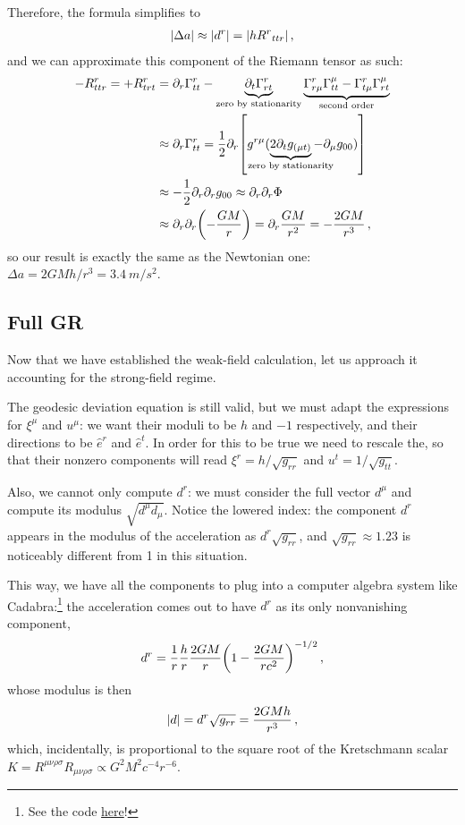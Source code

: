 \documentclass[main.tex]{subfiles}
\begin{document}
Therefore, the formula simplifies to 
%
\begin{align}
\abs{\Delta a} \approx \abs{d^{r}} = \abs{h R^{r}{}_{ttr} }
\,,
\end{align}
%
and we can approximate this component of the Riemann tensor as such: 
%
\begin{align}
-R^{r}_{ttr} =
+R^{r}_{trt} &= \partial_{r} \Gamma^{r}_{tt} - \underbrace{\partial_t \Gamma^{r}_{rt}}_{\text{zero by stationarity}}
\underbrace{\Gamma^{r}_{r \mu } \Gamma^{\mu }_{tt} - \Gamma^{r}_{t \mu } \Gamma^{\mu}_{r t}}_{\text{second order}}  \\
&\approx \partial_{r} \Gamma^{r}_{tt} = \frac{1}{2} \partial_{r} \qty[ g^{r \mu } (\underbrace{2\partial_{t} g_{(\mu t)}}_{\mathclap{\text{zero by stationarity}}}  - \partial_{\mu } g_{00})]  \\
&\approx - \frac{1}{2} \partial_{r} \partial_{r} g_{00} 
\approx \partial_{r} \partial_{r} \Phi  \\
&\approx \partial_{r} \partial_{r} \qty(- \frac{GM}{r}) = \partial_{r} \frac{GM}{r^2} = - \frac{2GM}{r^3}
\,,
\end{align}
%
so our result is exactly the same as the Newtonian one: \(\Delta a = 2GM h / r^3 = \SI{3.4}{m / s^2}\). 

\subsection{Full GR}

Now that we have established the weak-field calculation, let us approach it accounting for the strong-field regime. 

The geodesic deviation equation is still valid, but we must adapt the expressions for \(\xi^{\mu }\) and \(u^{\mu }\): 
we want their moduli to be \(h\) and \(-1\) respectively, and their directions to be \(\hat{e}^{r} \) and \(\hat{e}^{t}\).
In order for this to be true we need to rescale the, so that their nonzero components will read \(\xi^{r} = h / \sqrt{g_{rr}}\) and \(u^{t} = 1/\sqrt{g_{tt}}\). 

Also, we cannot only compute \(d^{r}\): we must consider the full vector \(d^{\mu }\) and compute its modulus \(\sqrt{d^{\mu } d_\mu }\). 
Notice the lowered index: the component \(d^{r}\) appears in the modulus of the acceleration as \(d^{r} \sqrt{g_{rr}}\), and \(\sqrt{g_{rr}} \approx \num{1.23}\) is noticeably different from 1 in this situation. 

This way, we have all the components to plug into a computer algebra system like Cadabra:\footnote{See the code \href{https://jacopok.github.io/schwarzschild.html}{here}!}
the acceleration comes out to have \(d^{r}\) as its only nonvanishing component, 
%
\begin{align}
d^{r} = \frac{1}{r} \frac{h}{r} \frac{2GM}{r} \qty(1 - \frac{2GM}{rc^2})^{-1/2}
\,,
\end{align}
%
whose modulus is then 
%
\begin{align}
\abs{d} = d^{r} \sqrt{g_{rr}} = \frac{2GMh}{r^3} 
\,,
\end{align}
%
which, incidentally, is proportional to the square root of the Kretschmann scalar \(K = R^{\mu \nu \rho \sigma } R_{\mu \nu \rho \sigma } \propto G^2M^2c^{-4} r^{-6}\). 
\end{document}
